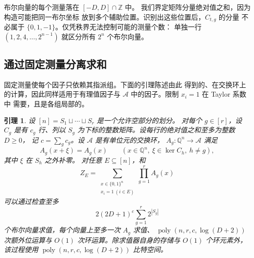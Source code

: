 \documentclass[11pt,reqno]{amsart}
\numberwithin{equation}{section}
\newtheorem{lemma}[theorem]{引理}
\theoremstyle{definition}\newtheorem{definition}[theorem]{定义}
\theoremstyle{remark}\newtheorem{remark}[theorem]{注}
\newcommand{\poly}{\operatorname{poly}}
\renewcommand{\ge}{\geqslant}
\begin{document}
布尔向量的每个测量落在 $[-D,D]\cap\mathbb Z$ 中。
我们界定矩阵分量绝对值之和，因为构造可能把同一布尔坐标
放到多个辅助位置。识别出这些位置后，$C_{t,g}$ 的分量
不必属于 $\{0,1,-1\}$。仅凭秩界无法控制可能的测量个数：
单独一行 $(1,2,4,\ldots,2^{n-1})$ 就区分所有 $2^n$
个布尔向量。

\subsection{通过固定测量分离求和}
\label{subsec:measurement-factorization}
固定测量使每个因子只依赖其指派组。下面的引理陈述由此
得到的、在交换环上的计算，因此同样适用于有理值因子与
$\mathcal A$ 中的因子。限制 $x_i=1$ 在 Taylor 系数中
需要，且是各组局部的。

\begin{lemma}\label{lem:measurement-separation}
设 $[n]=S_1\sqcup\cdots\sqcup S_r$ 是一个允许空部分的划分。
对每个 $g\in[r]$，设 $C_g$ 是有 $c_g$ 行、列以 $S_g$
为下标的整数矩阵。设每行的绝对值之和至多为整数 $D\ge0$，
记 $c=\sum_g c_g$。设 $\mathcal A$ 是有单位元的交换环，
$A_g:\mathbb Q^n\to\mathcal A$ 满足
\[
 A_g(x+\xi)=A_g(x)
 \qquad
 (x\in\mathbb Q^n,\ \xi\in\ker C_h,\ h\ne g),
\]
其中 $\xi$ 在 $S_h$ 之外补零。
对任意 $E\subseteq[n]$，和
\[
 Z_E=\sum_{\substack{x\in\{0,1\}^n\\x_i=1\ (i\in E)}}
           \prod_{g=1}^r A_g(x)
\]
可以通过检查至多
\[
 2(2D+1)^c\sum_{g=1}^r2^{|S_g|}
\]
个布尔向量求值，每个向量上至多一次 $A_g$ 求值、
$\poly(n,r,c,\log(D+2))$ 次额外位运算与 $O(1)$
次环运算。除求值器自身的存储与 $O(1)$ 个环元素外，
该过程使用 $\poly(n,r,c,\log(D+2))$ 比特空间。
\end{lemma}
\end{document}
